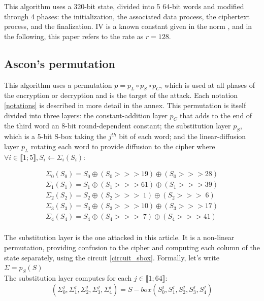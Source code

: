 \documentclass[11pt,technote]{IEEEtran}
\begin{document}
		\begin{algorithm}[h]
		\end{algorithm}
		
		This algorithm uses a 320-bit state, divided into 5 64-bit words and modified through 4 phases: the initialization, the associated data process, the ciphertext process, and the finalization. IV is a known constant given in the norm \cite{norme}, and in the following, this paper refers to the rate as $r=128$.
		
		
		\subsection{Ascon's permutation}	\label{perm}	
		This algorithm uses a permutation $p = p_L \circ p_S \circ p_C$, which is used at all phases of the encryption or decryption and is the target of the attack. Each notation \ref{notations} is described in more detail in the annex. This permutation is itself divided into three layers: the constant-addition layer $p_C$ that adds to the end of the third word an 8-bit round-dependent constant; the substitution layer $p_S$, which is a 5-bit S-box taking the $j^{th}$ bit of each word; and the linear-diffusion layer $p_L$ rotating each word to provide diffusion to the cipher where $\forall i \in \llbracket 1;5 \rrbracket, S_i \leftarrow \Sigma_i(S_i)$:
		
		\begin{gather*}
			\Sigma_0(S_0) = S_0 \oplus (S_0 >>> 19) \oplus (S_0 >>> 28)\\
			\Sigma_1(S_1) = S_1 \oplus (S_1 >>> 61) \oplus (S_1 >>> 39)\\
			\Sigma_2(S_2) = S_2 \oplus (S_2 >>> \;  1) \oplus (S_2 >>> \; 6)\\
			\Sigma_3(S_3) = S_3 \oplus (S_3 >>> 10) \oplus (S_3 >>> 17)\\
			\Sigma_4(S_4) = S_4 \oplus (S_4 >>> \; 7) \oplus (S_4 >>> 41)\\
		\end{gather*}
		
		The substitution layer is the one attacked in this article. It is a non-linear permutation, providing confusion to the cipher and computing each column of the state separately, using the circuit \ref{circuit_sbox}. Formally, let's write $\Sigma=p_S(S)$\\
		The substitution layer computes for each $j \in \llbracket 1;64 \rrbracket$:
		$$(\Sigma_0^j,\Sigma_1^j,\Sigma_2^j,\Sigma_3^j,\Sigma_4^j) = S-box(S_0^j,S_1^j,S_2^j,S_3^j,S_4^j)$$
		
\end{document}
